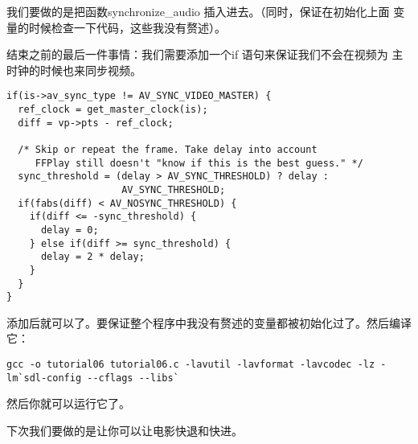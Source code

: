 我们要做的是把函数synchronize_audio 插入进去。（同时，保证在初始化上面
变量的时候检查一下代码，这些我没有赘述）。

结束之前的最后一件事情：我们需要添加一个if 语句来保证我们不会在视频为
主时钟的时候也来同步视频。
\begin{lstlisting}
if(is->av_sync_type != AV_SYNC_VIDEO_MASTER) {
  ref_clock = get_master_clock(is);
  diff = vp->pts - ref_clock;

  /* Skip or repeat the frame. Take delay into account
     FFPlay still doesn't "know if this is the best guess." */
  sync_threshold = (delay > AV_SYNC_THRESHOLD) ? delay :
                    AV_SYNC_THRESHOLD;
  if(fabs(diff) < AV_NOSYNC_THRESHOLD) {
    if(diff <= -sync_threshold) {
      delay = 0;
    } else if(diff >= sync_threshold) {
      delay = 2 * delay;
    }
  }
}
\end{lstlisting}

添加后就可以了。要保证整个程序中我没有赘述的变量都被初始化过了。然后编译它：
\begin{lstlisting}
gcc -o tutorial06 tutorial06.c -lavutil -lavformat -lavcodec -lz -lm`sdl-config --cflags --libs`
\end{lstlisting}
然后你就可以运行它了。

下次我们要做的是让你可以让电影快退和快进。
